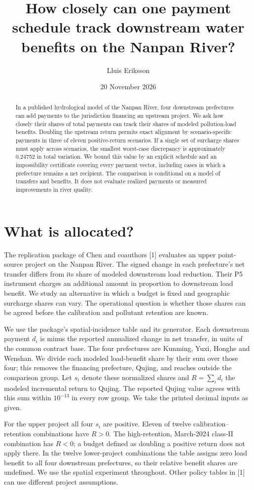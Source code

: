 \documentclass[11pt]{article}
\title{How closely can one payment schedule track downstream water benefits on the Nanpan River?}
\author{Lluis Eriksson}\date{20 November 2026}
\begin{document}
\maketitle
\begin{abstract}
In a published hydrological model of the Nanpan River, four downstream prefectures can add payments to the jurisdiction financing an upstream project. We ask how closely their shares of total payments can track their shares of modeled pollution-load benefits. Doubling the upstream return permits exact alignment by scenario-specific payments in three of eleven positive-return scenarios. If a single set of surcharge shares must apply across scenarios, the smallest worst-case discrepancy is approximately 0.24752 in total variation. We bound this value by an explicit schedule and an impossibility certificate covering every payment vector, including cases in which a prefecture remains a net recipient. The comparison is conditional on a model of transfers and benefits. It does not evaluate realized payments or measured improvements in river quality.
\end{abstract}
\section{What is allocated?}
The replication package of Chen and coauthors [1] evaluates an upper point-source project on the Nanpan River. The signed change in each prefecture's net transfer differs from its share of modeled downstream load reduction. Their P5 instrument charges an additional amount in proportion to downstream load benefit. We study an alternative in which a budget is fixed and geographic surcharge shares can vary. The operational question is whether those shares can be agreed before the calibration and pollutant retention are known.

We use the package's spatial-incidence table and its generator. Each downstream payment $d_i$ is minus the reported annualized change in net transfer, in units of the common contract base. The four prefectures are Kunming, Yuxi, Honghe and Wenshan. We divide each modeled load-benefit share by their sum over those four; this removes the financing prefecture, Qujing, and reaches outside the comparison group. Let $s_i$ denote these normalized shares and $R=\sum_i d_i$ the modeled incremental return to Qujing. The reported Qujing value agrees with this sum within $10^{-13}$ in every row group. We take the printed decimal inputs as given.

For the upper project all four $s_i$ are positive. Eleven of twelve calibration--retention combinations have $R>0$. The high-retention, March-2024 class-II combination has $R<0$; a budget defined as doubling a positive return does not apply there. In the twelve lower-project combinations the table assigns zero load benefit to all four downstream prefectures, so their relative benefit shares are undefined. We use the spatial experiment throughout. Other policy tables in [1] can use different project assumptions.
\end{document}
